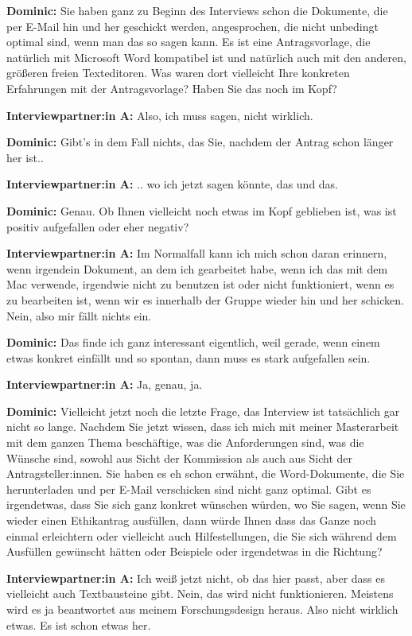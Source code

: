 \documentclass[a4paper,12pt,twoside]{scrreprt}
\begin{document}
\textbf{Dominic:} Sie haben ganz zu Beginn des Interviews schon die Dokumente, die per E-Mail hin und her geschickt werden, angesprochen, die nicht unbedingt optimal sind, wenn man das so sagen kann. Es ist eine Antragsvorlage, die natürlich mit Microsoft Word kompatibel ist und natürlich auch mit den anderen, größeren freien Texteditoren. Was waren dort vielleicht Ihre konkreten Erfahrungen mit der Antragsvorlage? Haben Sie das noch im Kopf?

\textbf{Interviewpartner:in A:} Also, ich muss sagen, nicht wirklich.

\textbf{Dominic:} Gibt’s in dem Fall nichts, das Sie, nachdem der Antrag schon länger her ist..

\textbf{Interviewpartner:in A:} .. wo ich jetzt sagen könnte, das und das.

\textbf{Dominic:} Genau. Ob Ihnen vielleicht noch etwas im Kopf geblieben ist, was ist positiv aufgefallen oder eher negativ?

\textbf{Interviewpartner:in A:} Im Normalfall kann ich mich schon daran erinnern, wenn irgendein Dokument, an dem ich gearbeitet habe, wenn ich das mit dem Mac verwende, irgendwie nicht zu benutzen ist oder nicht funktioniert, wenn es zu bearbeiten ist, wenn wir es innerhalb der Gruppe wieder hin und her schicken. Nein, also mir fällt nichts ein.

\textbf{Dominic:} Das finde ich ganz interessant eigentlich, weil gerade, wenn einem etwas konkret einfällt und so spontan, dann muss es stark aufgefallen sein.

\textbf{Interviewpartner:in A:} Ja, genau, ja.

\textbf{Dominic:} Vielleicht jetzt noch die letzte Frage, das Interview ist tatsächlich gar nicht so lange. Nachdem Sie jetzt wissen, dass ich mich mit meiner Masterarbeit mit dem ganzen Thema beschäftige, was die Anforderungen sind, was die Wünsche sind, sowohl aus Sicht der Kommission als auch aus Sicht der Antragsteller:innen. Sie haben es eh schon erwähnt, die Word-Dokumente, die Sie herunterladen und per E-Mail verschicken sind nicht ganz optimal. Gibt es irgendetwas, dass Sie sich ganz konkret wünschen würden, wo Sie sagen, wenn Sie wieder einen Ethikantrag ausfüllen, dann würde Ihnen dass das Ganze noch einmal erleichtern oder vielleicht auch Hilfestellungen, die Sie sich während dem Ausfüllen gewünscht hätten oder Beispiele oder irgendetwas in die Richtung?

\textbf{Interviewpartner:in A:} Ich weiß jetzt nicht, ob das hier passt, aber dass es vielleicht auch Textbausteine gibt. Nein, das wird nicht funktionieren. Meistens wird es ja beantwortet aus meinem Forschungsdesign heraus. Also nicht wirklich etwas. Es ist schon etwas her.
\end{document}
